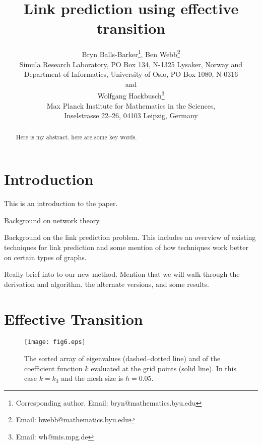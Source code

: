 \documentclass{imanum}
\begin{document}
\title{Link prediction using effective transition}

\author{%
{\sc
Bryn Balls-Barker\thanks{Corresponding author. Email: bryn@mathematics.byu.edu},
Ben Webb\thanks{Email: bwebb@mathematics.byu.edu}
} \\[2pt]
Simula Research Laboratory, PO Box 134, N-1325 Lysaker, Norway and\\
Department of Informatics, University of Oslo, PO Box 1080, N-0316\\[6pt]
{\sc and}\\[6pt]
{\sc Wolfgang Hackbusch}\thanks{Email: wh@mis.mpg.de}\\[2pt]
Max Planck Institute for Mathematics in the Sciences,\\
Inselstrasse 22--26, 04103 Leipzig, Germany
}

\maketitle

\begin{abstract}
{Here is my abstract.}
{here are some key words.}
\end{abstract}


\section{Introduction}
\label{sec;introduction}

This is an introduction to the paper. 

Background on network theory.

Background on the link prediction problem. This includes an overview of existing techniques for link prediction and some mention of how techniques work better on certain types of graphs.

Really brief into to our new method. Mention that we will walk through the derivation and algorithm, the alternate versions, and some results.

\section{Effective Transition}
\label{sec;effectivetransition}


\begin{figure}[!t]
\centering\texttt{[image: fig6.eps]}
\caption{The sorted array of eigenvalues
(dashed--dotted line) and of the coefficient function $k$ evaluated
at the grid points (solid line). In this case $k=k_3$ and the
mesh size is $h=0.05$.}
\label{fig:6}
\end{figure}
\end{document}
